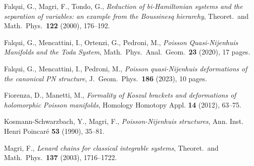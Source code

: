 \documentclass[12pt]{article}
\begin{document}
 Falqui, G., Magri, F., Tondo, G.,
{\it Reduction of bi-Hamiltonian systems and the separation of variables: an example from the Boussinesq hierarchy\/}, 
Theoret.\ and Math.\ Phys.\ {\bf 122} (2000), 176--192.

 Falqui, G., Mencattini, I., Ortenzi, G., Pedroni, M.,
{\it Poisson Quasi-Nijenhuis Manifolds and the Toda System\/}, Math.\ Phys.\ Anal.\ Geom.\ {\bf 23} (2020), 17 pages.

 Falqui, G., Mencattini, I., Pedroni, M.,
{\it Poisson quasi-Nijenhuis deformations of the canonical PN structure\/}, J.\ Geom.\ Phys.\  {\bf 186} (2023), 10 pages.


 Fiorenza, D., Manetti, M.,
{\it Formality of Koszul brackets and deformations of holomorphic Poisson manifolds},
Homology Homotopy Appl. {\bf 14} (2012), 63--75. 



 Kosmann-Schwarzbach, Y., Magri, F., {\it Poisson-Nijenhuis structures}, Ann. Inst. Henri Poincar\'e {\bf 53} (1990), 35--81.



 Magri, F., 
{\it Lenard chains for classical integrable systems}, Theoret.\ and Math.\ Phys.\ {\bf 137} (2003), 1716--1722.

\end{document}
